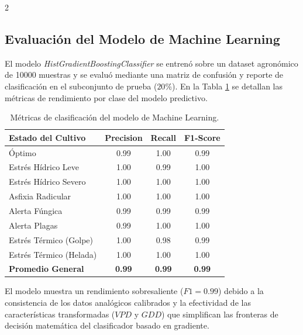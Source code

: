 \documentclass[a4paper, 11pt]{article}
\begin{document}
\begin{multicols}{2}
\subsection{Evaluación del Modelo de Machine Learning}
El modelo \textit{HistGradientBoostingClassifier} se entrenó sobre un dataset agronómico de \num{10000} muestras y se evaluó mediante una matriz de confusión y reporte de clasificación en el subconjunto de prueba ($20\%$). En la Tabla \ref{tab:resultadosML} se detallan las métricas de rendimiento por clase del modelo predictivo.

\begin{table}[H]
\centering
\caption{Métricas de clasificación del modelo de Machine Learning.}
\label{tab:resultadosML}
\begin{tabular}{lccc}
\toprule
\textbf{Estado del Cultivo} & \textbf{Precision} & \textbf{Recall} & \textbf{F1-Score} \\
\midrule
Óptimo & 0.99 & 1.00 & 0.99 \\
Estrés Hídrico Leve & 1.00 & 0.99 & 1.00 \\
Estrés Hídrico Severo & 1.00 & 1.00 & 1.00 \\
Asfixia Radicular & 1.00 & 1.00 & 1.00 \\
Alerta Fúngica & 0.99 & 0.99 & 0.99 \\
Alerta Plagas & 0.99 & 1.00 & 1.00 \\
Estrés Térmico (Golpe) & 1.00 & 0.98 & 0.99 \\
Estrés Térmico (Helada) & 1.00 & 1.00 & 1.00 \\
\midrule
\textbf{Promedio General} & \textbf{0.99} & \textbf{0.99} & \textbf{0.99} \\
\bottomrule
\end{tabular}
\end{table}

El modelo muestra un rendimiento sobresaliente ($F1 = 0.99$) debido a la consistencia de los datos analógicos calibrados y la efectividad de las características transformadas ($VPD$ y $GDD$) que simplifican las fronteras de decisión matemática del clasificador basado en gradiente.


\end{multicols}
\end{document}
